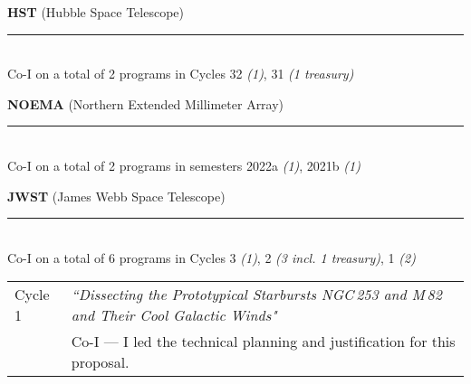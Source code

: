 \documentclass[11pt]{article}
\makeatletter
\def\vhrulefill#1{\leavevmode\leaders\hrule\@height#1\hfill \kern\z@}
\makeatother
\begin{document}
{\bf HST} {\small (Hubble Space Telescope)} \vhrulefill{0.5pt}\\
Co-I on a total of 2 programs in Cycles 32 {\em(1)}, 31 {\em(1 treasury)}\medskip


{\bf NOEMA} {\small (Northern Extended Millimeter Array)} \vhrulefill{0.5pt}\\
Co-I on a total of 2 programs in semesters 2022a {\em(1)}, 2021b {\em(1)}\medskip


{\bf JWST} {\small (James Webb Space Telescope)} \vhrulefill{0.5pt}\\
Co-I on a total of  6 programs in Cycles 3 {\em(1)}, 2 {\em(3 incl. 1 treasury)}, 1 {\em(2)}
\vspace{-9pt}
\begin{longtable}{p{}p{}}
Cycle 1 &  \textit{``Dissecting the Prototypical Starbursts NGC\,253 and M\,82 and Their Cool Galactic Winds"}\\
& {\small Co-I --- I led the technical planning and justification for this proposal.}\\
\end{longtable}
\vspace{-12pt}
\medskip
\end{document}
